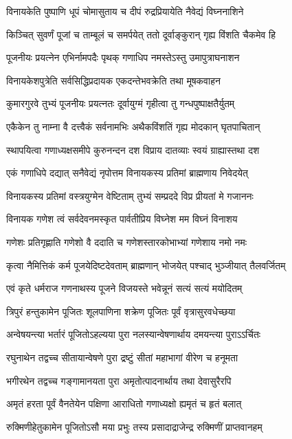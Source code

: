 \twolineshloka
{विनायकेति पुष्पाणि धूपं चोमासुताय च}
{दीपं रुद्रप्रियायेति नैवेद्यं विघ्ननाशिने}%

\twolineshloka
{किञ्चित् सुवर्णं पूजां च ताम्बूलं च समर्पयेत्}
{ततो दूर्वाङ्कुरान् गृह्य विंशति चैकमेव हि}%

\twolineshloka
{पूजनीयः प्रयत्नेन एभिर्नामपदैः पृथक्}
{गणाधिप नमस्तेऽस्तु उमापुत्राघनाशन}%

\twolineshloka
{विनायकेशपुत्रेति सर्वसिद्धिप्रदायक}
{एकदन्तेभवक्रेति तथा मूषकवाहन}%

\twolineshloka
{कुमारगुरवे तुभ्यं पूजनीयः प्रयत्नतः}
{दूर्वायुग्मं गृहीत्वा तु गन्धपुष्पाक्षतैर्युतम्}%

\twolineshloka
{एकैकेन तु नाम्ना वै दत्त्वैकं सर्वनामभिः}
{अथैकविंशतिं गृह्य मोदकान् घृतपाचितान्}%

\twolineshloka
{स्थापयित्वा गणाध्यक्षसमीपे कुरुनन्दन}
{दश विप्राय दातव्याः स्वयं ग्राह्यास्तथा दश}%

\twolineshloka
{एकं गणाधिपे दद्यात् सनैवेद्यं नृपोत्तम}
{विनायकस्य प्रतिमां ब्राह्मणाय निवेदयेत्}%

\twolineshloka
{विनायकस्य प्रतिमां वस्त्रयुग्मेन वेष्टिताम्}
{तुभ्यं सम्प्रददे विप्र प्रीयतां मे गजाननः}%

\twolineshloka
{विनायक गणेश त्वं सर्वदेवनमस्कृत}
{पार्वतीप्रिय विघ्नेश मम विघ्नं विनाशय}%

\twolineshloka
{गणेशः प्रतिगृह्णाति गणेशो वै ददाति च}
{गणेशस्तारकोभाभ्यां गणेशाय नमो नमः}%

\twolineshloka
{कृत्वा नैमित्तिकं कर्म पूजयेदिष्टदेवताम्}
{ब्राह्मणान् भोजयेत् पश्चाद् भुञ्जीयात् तैलवर्जितम्}%

\twolineshloka
{एवं कृते धर्मराज गणनाथस्य पूजने}
{विजयस्ते भवेन्नूनं सत्यं सत्यं मयोदितम्}%

\twolineshloka
{त्रिपुरं हन्तुकामेन पूजितः शूलपाणिना}
{शक्रेण पूजितः पूर्वं वृत्रासुरवधेच्छया}%

\twolineshloka
{अन्वेषयन्त्या भर्तारं पूजितोऽहल्यया पुरा}
{नलस्यान्वेषणार्थाय दमयन्त्या पुराऽऽर्चितः}%

\twolineshloka
{रघुनाथेन तद्वच्च सीतायान्वेषणे पुरा}
{द्रष्टुं सीतां महाभागां वीरेण च हनूमता}%

\twolineshloka
{भगीरथेन तद्वच्च गङ्गामानयता पुरा}
{अमृतोत्पादनार्थाय तथा देवासुरैरपि}%

\twolineshloka
{अमृतं हरता पूर्वं वैनतेयेन पक्षिणा}
{आराधितो गणाध्यक्षो ह्यमृतं च हृतं बलात्}%

\twolineshloka
{रुक्मिणीहेतुकामेन पूजितोऽसौ मया प्रभुः}
{तस्य प्रसादाद्राजेन्द्र रुक्मिणीं प्राप्तवानहम्}%

